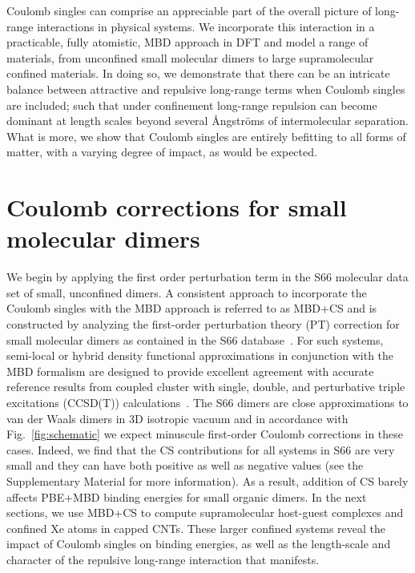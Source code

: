\documentclass[aps,prl,groupaddress, twocolumn]{revtex4-1}  %
\begin{document}
Coulomb singles can comprise an appreciable part of the overall picture of long-range interactions in physical systems. We incorporate this interaction in a practicable, fully atomistic, MBD approach in DFT and model a range of materials, from unconfined small molecular dimers to large supramolecular confined materials. In doing so, we demonstrate that there can be an intricate balance between attractive and repulsive long-range terms when Coulomb singles are included; such that under confinement long-range repulsion can become dominant at length scales beyond several \r{A}ngstr\"{o}ms of intermolecular separation. What is more, we show that Coulomb singles are entirely befitting to all forms of matter, with a varying degree of impact, as would be expected. 

\section*{Coulomb corrections for small molecular dimers}
We begin by applying the first order perturbation term in the S66 molecular data set of small, unconfined dimers. A consistent approach to incorporate the Coulomb singles with the MBD approach is referred to as MBD+CS and is constructed by analyzing the first-order perturbation theory (PT) correction for small molecular dimers as contained in the S66 database~\cite{s66X8_database}.
For such systems, semi-local or hybrid density functional approximations in conjunction with the MBD formalism are designed to provide excellent agreement with accurate reference results from coupled cluster with single, double, and perturbative triple excitations (CCSD(T)) calculations~\cite{Tkatchenko2012}.  %
The S66 dimers are close approximations to van der Waals dimers in 3D isotropic vacuum and in accordance with Fig.~\ref{fig:schematic} we expect minuscule first-order Coulomb corrections in these cases.
Indeed, we find that the CS contributions for all systems in S66 are very small and they can have both positive as well as negative values (see the Supplementary Material for more information). As a result, addition of CS barely affects PBE+MBD binding energies for small organic dimers.
In the next sections, we use MBD+CS to compute supramolecular host-guest complexes and confined Xe atoms in capped CNTs. These larger confined systems reveal the impact of Coulomb singles on binding energies, as well as the length-scale and character of the repulsive long-range interaction that manifests. 
\end{document}
